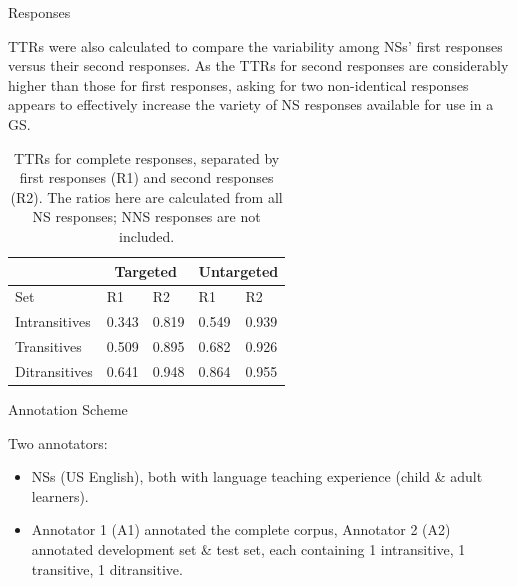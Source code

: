 \documentclass[final,t]{beamer}
\begin{document}
\begin{frame}{}
\begin{columns}[t]
\begin{column}{.33\linewidth}
\begin{block}{Responses}
\begin{center}
\begin{minipage}{.85\textwidth}
\vspace{1em}
TTRs were also calculated to compare the variability among NSs' first responses versus their second responses. As the TTRs for second responses are considerably higher than those for first responses, asking for two non-identical responses appears to effectively increase the variety of NS responses available for use in a GS.
\vspace{.5em}
\begin{table}[hb!]
\begin{center}
\begin{tabular}{|l||l|l||l|l|}
\hline
 & \multicolumn{2}{|c||}{Targeted} & \multicolumn{2}{|c|}{Untargeted} \\
\hline
 Set & R1 & R2 & R1 & R2 \\
\hline
\hline
Intransitives & 0.343 & 0.819 & 0.549 & 0.939 \\
\hline
Transitives & 0.509 & 0.895 & 0.682 & 0.926 \\
\hline
Ditransitives & 0.641 & 0.948 & 0.864 & 0.955  \\ 
\hline
\end{tabular}
\caption{\label{tab:ttr1v2} TTRs for complete responses, separated by first responses (R1) and second responses (R2). The ratios here are calculated from all NS responses; NNS responses are not included.}
\end{center}
\end{table}

\end{minipage}
\end{center}
\vspace{-.5em}
\end{block} 

\begin{block}{Annotation Scheme}
\begin{center}
\begin{minipage}{.85\textwidth}
Two annotators:
\begin{itemize}
	\item NSs (US English), both with language teaching experience (child \& adult learners).
	\item Annotator 1 (A1) annotated the complete corpus, Annotator 2 (A2) annotated development set \& test set, each containing 1 intransitive, 1 transitive, 1 ditransitive.
\end{itemize}
\vspace{1em}


\end{minipage}
\end{center}
\end{block}
\end{column}
\end{columns}
\end{frame}
\end{document}

